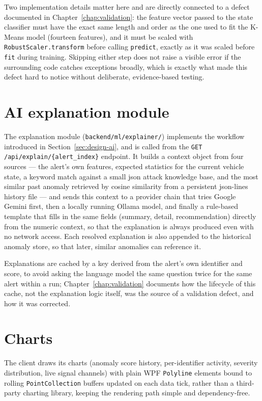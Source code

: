 Two implementation details matter here and are directly connected to a defect documented in Chapter~\ref{chap:validation}: the feature vector passed to the state classifier must have the exact same length and order as the one used to fit the K-Means model (fourteen features), and it must be scaled with \texttt{RobustScaler.transform} before calling \texttt{predict}, exactly as it was scaled before \texttt{fit} during training. Skipping either step does not raise a visible error if the surrounding code catches exceptions broadly, which is exactly what made this defect hard to notice without deliberate, evidence-based testing.

\section{AI explanation module}

The explanation module (\texttt{backend/ml/explainer/}) implements the workflow introduced in Section~\ref{sec:design-ai}, and is called from the \texttt{GET /api/explain/\{alert\_index\}} endpoint. It builds a context object from four sources — the alert's own features, expected statistics for the current vehicle state, a keyword match against a small \gls{json} attack knowledge base, and the most similar past anomaly retrieved by cosine similarity from a persistent \gls{json}-lines history file — and sends this context to a provider chain that tries Google Gemini first, then a locally running Ollama model, and finally a rule-based template that fills in the same fields (summary, detail, recommendation) directly from the numeric context, so that the explanation is always produced even with no network access. Each resolved explanation is also appended to the historical anomaly store, so that later, similar anomalies can reference it.

Explanations are cached by a key derived from the alert's own identifier and score, to avoid asking the language model the same question twice for the same alert within a run; Chapter~\ref{chap:validation} documents how the lifecycle of this cache, not the explanation logic itself, was the source of a validation defect, and how it was corrected.

\section{Charts}

The client draws its charts (anomaly score history, per-identifier activity, severity distribution, live signal channels) with plain WPF \texttt{Polyline} elements bound to rolling \texttt{PointCollection} buffers updated on each data tick, rather than a third-party charting library, keeping the rendering path simple and dependency-free.

